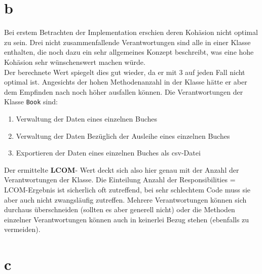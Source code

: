 \section*{b}
Bei erstem Betrachten der Implementation erschien deren Kohäsion nicht optimal zu sein. Drei nicht zusammenfallende Verantwortungen sind alle in einer Klasse enthalten, die noch dazu ein sehr allgemeines Konzept beschreibt, was eine hohe Kohäsion sehr wünschenswert machen würde.\\
Der berechnete Wert spiegelt dies gut wieder, da er mit 3 auf jeden Fall nicht optimal ist. Angesichts der hohen Methodenanzahl in der Klasse hätte er aber dem Empfinden nach noch höher ausfallen können.
Die Verantwortungen der Klasse \texttt{Book} sind:
\begin{enumerate}
	\item Verwaltung der Daten eines einzelnen Buches
	\item Verwaltung der Daten Bezüglich der Ausleihe eines einzelnen Buches
	\item Exportieren der Daten eines einzelnen Buches als csv-Datei
\end{enumerate}
 Der ermittelte \textbf{LCOM}- Wert deckt sich also hier genau mit der Anzahl der Verantwortungen der Klasse. Die Einteilung Anzahl der Responsibilities = LCOM-Ergebnis ist sicherlich oft zutreffend, bei sehr schlechtem Code muss sie aber auch nicht zwangsläufig zutreffen. Mehrere Verantwortungen können sich durchaus überschneiden (sollten es aber generell nicht)
 oder die Methoden einzelner Verantwortungen können auch in keinerlei Bezug stehen (ebenfalls zu vermeiden).
 
 
\section*{c}
\lstset{language=Java,
	showspaces=false,
	showtabs=false,
	breaklines=true,
	showstringspaces=false,
	breakatwhitespace=true,
}



